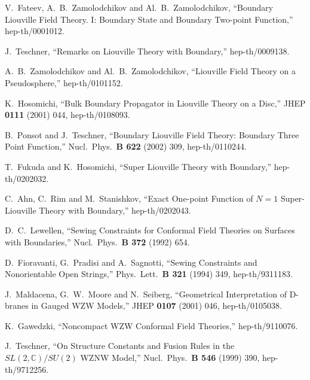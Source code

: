 \documentclass[a4paper,12pt]{article}
\newcommand{\bc}{\mathbb C}
\begin{document}
\begin{thebibliography}{99}
V.~Fateev, A.~B.~Zamolodchikov and Al.~B.~Zamolodchikov,
``Boundary Liouville Field Theory. I: Boundary State and Boundary
	Two-point Function,'' hep-th/0001012.


J.~Teschner,
``Remarks on Liouville Theory with Boundary,'' hep-th/0009138.

A.~B.~Zamolodchikov and Al.~B.~Zamolodchikov, 
``Liouville Field Theory on a Pseudosphere,'' hep-th/0101152.


K.~Hosomichi,
``Bulk Boundary Propagator in Liouville Theory on a Disc,''
JHEP {\bf 0111} (2001) 044, hep-th/0108093.

B.~Ponsot and J.~Teschner,
``Boundary Liouville Field Theory: Boundary Three Point Function,''
Nucl.\ Phys.\ {\bf B 622} (2002) 309, hep-th/0110244.


T.~Fukuda and K.~Hosomichi,
``Super Liouville Theory with Boundary,'' hep-th/0202032.


C.~Ahn, C.~Rim and M.~Stanishkov,
``Exact One-point Function of $N = 1$ Super-Liouville Theory with Boundary,''
hep-th/0202043.

D.~C.~Lewellen,
``Sewing Constraints for Conformal Field Theories on Surfaces with
	Boundaries,'' 
Nucl.\ Phys.\ {\bf B 372} (1992) 654.

D.~Fioravanti, G.~Pradisi and A.~Sagnotti,
``Sewing Constraints and Nonorientable Open Strings,''
Phys.\ Lett.\ {\bf B 321} (1994) 349, hep-th/9311183.

J.~Maldacena, G.~W.~Moore and N.~Seiberg,
``Geometrical Interpretation of D-branes in Gauged WZW Models,''
JHEP {\bf 0107} (2001) 046,
hep-th/0105038.

K.~Gawedzki,
``Noncompact WZW Conformal Field Theories,'' hep-th/9110076.

J.~Teschner,
``On Structure Constants and Fusion Rules in the $SL(2,\bc)/SU(2)$ WZNW
	Model,'' 
Nucl.\ Phys.\ {\bf B 546} (1999) 390, hep-th/9712256.

\end{thebibliography}
\end{document}
